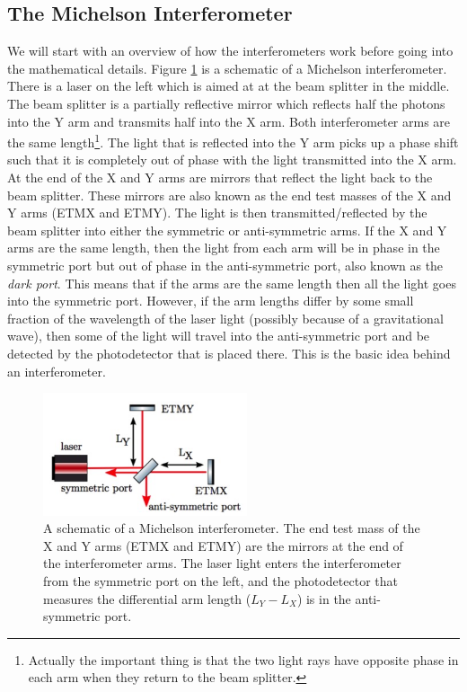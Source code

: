 \documentclass[11pt]{cuthesis}
\begin{document}
\subsection{The Michelson Interferometer} \label{sec:mich}
We will start with an overview of how the interferometers work before going into the mathematical details. Figure \ref{fig:ifo} is a schematic of a Michelson interferometer. There is a laser on the left which is aimed at at the beam splitter in the middle. The beam splitter is a partially reflective mirror which reflects half the photons into the Y arm and transmits half into the X arm. Both interferometer arms are the same length\footnote{Actually the important thing is that the two light rays have opposite phase in each arm when they return to the beam splitter.}. The light that is reflected into the Y arm picks up a phase shift such that it is completely out of phase with the light transmitted into the X arm. At the end of the X and Y arms are mirrors that reflect the light back to the beam splitter. These mirrors are also known as the end test masses of the X and Y arms (ETMX and ETMY). The light is then transmitted/reflected by the beam splitter into either the symmetric or anti-symmetric arms. If the X and Y arms are the same length, then the light from each arm will be in phase in the symmetric port but out of phase in the anti-symmetric port, also known as the \emph{dark port}. This means that if the arms are the same length then all the light goes into the symmetric port. However, if the arm lengths differ by some small fraction of the wavelength of the laser light (possibly because of a gravitational wave), then some of the light will travel into the anti-symmetric port and be detected by the photodetector that is placed there. This is the basic idea behind an interferometer.

\begin{figure}[ht]
\centering
\includegraphics[width=6cm]{michelson.png} 
\caption{A schematic of a Michelson interferometer. The end test mass of the X and Y arms (ETMX and ETMY) are the mirrors at the end of the interferometer arms. The laser light enters the interferometer from the symmetric port on the left, and the photodetector that measures the differential arm length ($L_Y-L_X$) is in the anti-symmetric port. \cite{ifo_tech} }
\label{fig:ifo}
\end{figure} 
\end{document}
